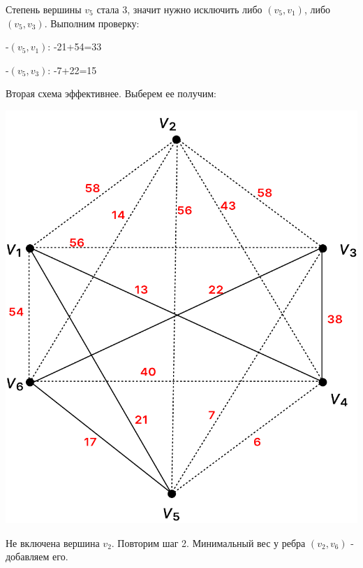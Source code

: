 \documentclass[12pt]{article}
\begin{document}
Степень вершины $v_5$ стала 3, значит нужно исключить либо $(v_5, v_1)$, либо
$(v_5, v_3)$. Выполним проверку:

-$(v_5, v_1)$: -21+54=33

-$(v_5, v_3)$: -7+22=15

Вторая схема эффективнее. Выберем ее получим:

\begin{center}
\includegraphics[scale=.6]{19_6.pdf}
\end{center}

Не включена вершина $v_2$. Повторим шаг 2. Минимальный вес у ребра $(v_2, v_6)$ -
 добавляем его.
\end{document}
